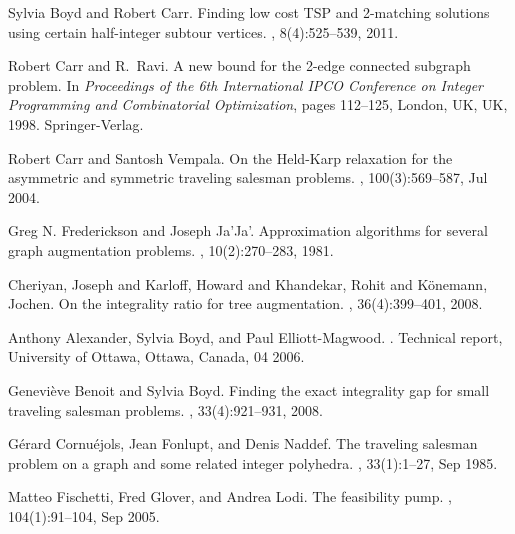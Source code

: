 \documentclass[runningheads]{llncs}
\begin{document}
%
%
%
% 
% 
%
\begin{thebibliography}{10}
	
	
	Sylvia Boyd and Robert Carr.
	\newblock Finding low cost TSP and 2-matching solutions using certain
	half-integer subtour vertices.
	, 8(4):525--539, 2011.
	
	Robert Carr and R.~Ravi.
	\newblock A new bound for the 2-edge connected subgraph problem.
	\newblock In {\em Proceedings of the 6th International IPCO Conference on
		Integer Programming and Combinatorial Optimization}, pages 112--125, London,
	UK, UK, 1998. Springer-Verlag.
	
	Robert Carr and Santosh Vempala.
	\newblock On the {H}eld-{K}arp relaxation for the asymmetric and symmetric
	traveling salesman problems.
	, 100(3):569--587, Jul 2004.
	
	Greg N. Frederickson and Joseph Ja'Ja'.
	\newblock Approximation algorithms for several graph
	augmentation problems.
	, 10(2):270--283, 1981.
	
	Cheriyan, Joseph and Karloff, Howard and Khandekar, Rohit and K{\"o}nemann, Jochen.
	\newblock On the integrality ratio for tree augmentation.
	, 36(4):399--401, 2008.
    	
    Anthony Alexander, Sylvia Boyd, and Paul Elliott-Magwood.
    .
    \newblock Technical report, University of Ottawa, Ottawa, Canada, 04 2006.
    
    Geneviève Benoit and Sylvia Boyd.
    \newblock Finding the exact integrality gap for small traveling salesman
      problems.
    , 33(4):921--931, 2008.

	G{\'e}rard Cornu{\'e}jols, Jean Fonlupt, and Denis Naddef.
	\newblock The traveling salesman problem on a graph and some related integer
	polyhedra.
	, 33(1):1--27, Sep 1985.
	
	Matteo Fischetti, Fred Glover, and Andrea Lodi.
	\newblock The feasibility pump.
	, 104(1):91--104, Sep 2005.
	

\end{thebibliography}
\end{document}
